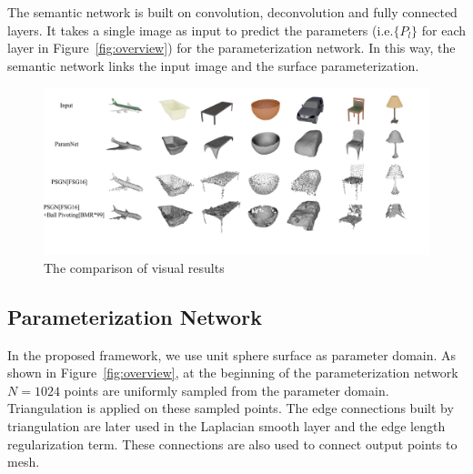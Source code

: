 The semantic network is built on convolution, deconvolution and fully connected layers. It takes a single image as input to predict the parameters (i.e.$\{P_l\}$ for each layer in Figure~\ref{fig:overview}) for the parameterization network. 
In this way, the semantic network links the input image and the surface parameterization.


\begin{figure}[htbp]
	\centering
	\includegraphics[width=\linewidth]{img/res/res}
	\caption{The comparison of visual results}
	\label{fig:res}
\end{figure}

\subsection{Parameterization Network}
In the proposed framework, we use unit sphere surface as parameter domain. 
As shown in Figure~\ref{fig:overview}, at the beginning of the parameterization network $N=1024$ points are uniformly sampled from the parameter domain. Triangulation is applied on these sampled points. 
The edge connections built by triangulation are later used in the Laplacian smooth layer and the edge length regularization term. 
These connections are also used to connect output points to mesh.


